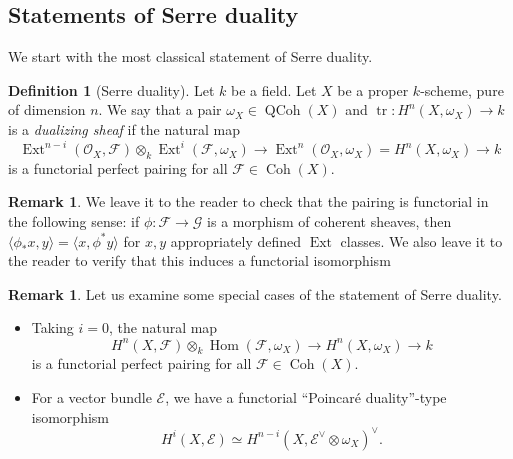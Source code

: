 \documentclass[10pt]{article}
\newtheorem{prop}[thm]{Proposition}
\theoremstyle{definition}
\newtheorem{defn}[thm]{Definition}
\newtheorem{rmk}[thm]{Remark}
\DeclareMathOperator{\Hom}{Hom}
\DeclareMathOperator{\Ext}{Ext}
\DeclareMathOperator{\Coh}{Coh}
\DeclareMathOperator{\dmod}{-mod}
\DeclareMathOperator{\shHom}{\mathcal{H}\emph{om}}
\DeclareMathOperator{\QCoh}{QCoh}
\DeclareMathOperator{\tr}{tr}
\newcommand{\OO}{\mathcal{O}}
\begin{document}
%
%

\subsection{Statements of Serre duality}


We start with the most classical statement of Serre duality.
\begin{defn}[Serre duality]
Let $k$ be a field.  Let $X$ be a proper $k$-scheme, pure of dimension $n$.  We say that a pair $\omega_X \in \QCoh(X)$ and $\tr: H^n(X, \omega_X) \rightarrow k$ is a \emph{dualizing sheaf} if the natural map
$$\Ext^{n-i}(\OO_X, \mathcal{F}) \otimes_k \Ext^i(\mathcal{F}, \omega_X) \rightarrow \Ext^n(\OO_X, \omega_X) = H^n(X, \omega_X) \rightarrow k$$
is a functorial perfect pairing for all $\mathcal{F} \in \Coh(X)$.
\end{defn}

\begin{rmk}
We leave it to the reader to check that the pairing is functorial in the following sense: if $\phi: \mathcal{F} \rightarrow \mathcal{G}$ is a morphism of coherent sheaves, then $\langle \phi_* x, y \rangle = \langle x, \phi^* y \rangle$ for $x, y$ appropriately defined $\Ext$ classes.  We also leave it to the reader to verify that this induces a functorial isomorphism
\end{rmk}

\begin{rmk}
Let us examine some special cases of the statement of Serre duality.
\begin{itemize}
\item Taking $i=0$, the natural map
$$H^n(X, \mathcal{F}) \otimes_k \Hom(\mathcal{F}, \omega_X) \rightarrow H^n(X, \omega_X) \rightarrow k$$
is a functorial perfect pairing for all $\mathcal{F} \in \Coh(X)$.
\item For a vector bundle $\mathcal{E}$, we have a functorial ``Poincar\'{e} duality''-type isomorphism
$$H^{i}(X, \mathcal{E}) \simeq H^{n-i}(X, \mathcal{E}^\vee \otimes \omega_X)^\vee.$$
\end{itemize}
\end{rmk}
\end{document}
